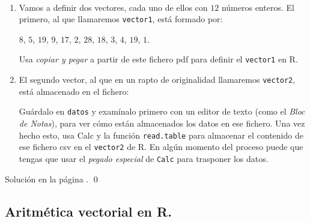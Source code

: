 \documentclass[10pt,a4paper]{article}\usepackage[]{graphicx}\usepackage[]{color}
\newcounter {cont01}
\begin{document}
\begin{ejercicio}
\label{tut02:ejercicio06}
\quad\\
\begin{enumerate}
  \item Vamos a definir dos vectores, cada uno de ellos con $12$ números enteros. El primero, al que llamaremos {\tt vector1}, está formado por:
      \begin{center}
        $8$, $5$, $19$, $9$, $17$, $2$, $28$, $18$, $3$, $4$, $19$, $1$.
      \end{center}
      Usa {\em copiar y pegar} a partir de este fichero pdf para definir el {\tt vector1} en R.

  \item El segundo vector, al que en un rapto de originalidad llamaremos {\tt vector2}, está almacenado en el fichero:
      \begin{center}
      \end{center}
      Guárdalo en {\tt datos} y examínalo primero con un editor de texto (como el {\em Bloc de Notas}), para ver cómo están almacenados los datos en ese fichero. Una vez hecho esto, usa Calc y la función {\tt read.table} para almacenar el contenido de ese fichero csv en  el {\tt vector2} de R. En algún momento del proceso puede que tengas que usar el {\em pegado especial} de {\tt Calc} para trasponer los datos.
\end{enumerate}
Solución en la página \pageref{tut02:ejercicio06:sol}. \qed
\end{ejercicio}

\subsection{Aritmética vectorial en R.}
\label{tut02:subsec:AritmeticaVectorial}
\end{document}

